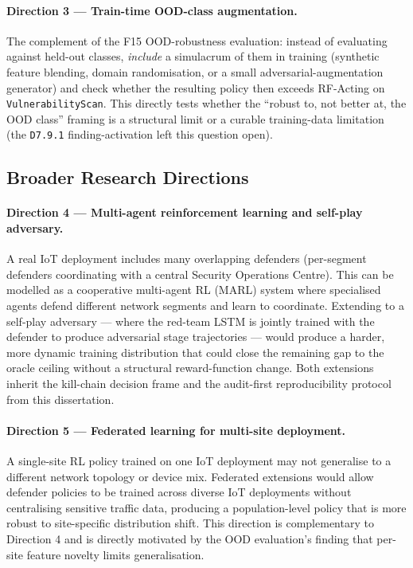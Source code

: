 \paragraph{Direction 3 --- Train-time OOD-class augmentation.} The complement of the F15 OOD-robustness evaluation: instead of evaluating against held-out classes, \emph{include} a simulacrum of them in training (synthetic feature blending, domain randomisation, or a small adversarial-augmentation generator) and check whether the resulting policy then exceeds RF-Acting on \texttt{VulnerabilityScan}. This directly tests whether the ``robust to, not better at, the OOD class'' framing is a structural limit or a curable training-data limitation (the \texttt{D7.9.1} finding-activation left this question open).

\subsection{Broader Research Directions}

\paragraph{Direction 4 --- Multi-agent reinforcement learning and self-play adversary.} A real IoT deployment includes many overlapping defenders (per-segment defenders coordinating with a central Security Operations Centre). This can be modelled as a cooperative multi-agent RL (MARL) system where specialised agents defend different network segments and learn to coordinate. Extending to a self-play adversary --- where the red-team LSTM is jointly trained with the defender to produce adversarial stage trajectories --- would produce a harder, more dynamic training distribution that could close the remaining gap to the oracle ceiling without a structural reward-function change. Both extensions inherit the kill-chain decision frame and the audit-first reproducibility protocol from this dissertation.

\paragraph{Direction 5 --- Federated learning for multi-site deployment.} A single-site RL policy trained on one IoT deployment may not generalise to a different network topology or device mix. Federated extensions would allow defender policies to be trained across diverse IoT deployments without centralising sensitive traffic data, producing a population-level policy that is more robust to site-specific distribution shift. This direction is complementary to Direction 4 and is directly motivated by the OOD evaluation's finding that per-site feature novelty limits generalisation.

